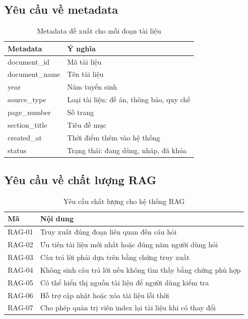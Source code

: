 \subsection{Yêu cầu về metadata}
\begin{table}[H]
\centering
\caption{Metadata đề xuất cho mỗi đoạn tài liệu}
\label{tab:rag_metadata}
\begin{tabular}{|p{3.6cm}|p{8.4cm}|}
\hline
\textbf{Metadata} & \textbf{Ý nghĩa} \\ \hline
document\_id & Mã tài liệu \\ \hline
document\_name & Tên tài liệu \\ \hline
year & Năm tuyển sinh \\ \hline
source\_type & Loại tài liệu: đề án, thông báo, quy chế \\ \hline
page\_number & Số trang \\ \hline
section\_title & Tiêu đề mục \\ \hline
created\_at & Thời điểm thêm vào hệ thống \\ \hline
status & Trạng thái: đang dùng, nháp, đã khóa \\ \hline
\end{tabular}
\end{table}

\subsection{Yêu cầu về chất lượng RAG}
\begin{table}[H]
\centering
\caption{Yêu cầu chất lượng cho hệ thống RAG}
\label{tab:rag_quality}
\begin{tabular}{|p{2.2cm}|p{9.8cm}|}
\hline
\textbf{Mã} & \textbf{Nội dung} \\ \hline
RAG-01 & Truy xuất đúng đoạn liên quan đến câu hỏi \\ \hline
RAG-02 & Ưu tiên tài liệu mới nhất hoặc đúng năm người dùng hỏi \\ \hline
RAG-03 & Câu trả lời phải dựa trên bằng chứng truy xuất \\ \hline
RAG-04 & Không sinh câu trả lời nếu không tìm thấy bằng chứng phù hợp \\ \hline
RAG-05 & Có thể hiển thị nguồn tài liệu để người dùng kiểm tra \\ \hline
RAG-06 & Hỗ trợ cập nhật hoặc xóa tài liệu lỗi thời \\ \hline
RAG-07 & Cho phép quản trị viên index lại tài liệu khi có thay đổi \\ \hline
\end{tabular}
\end{table}
